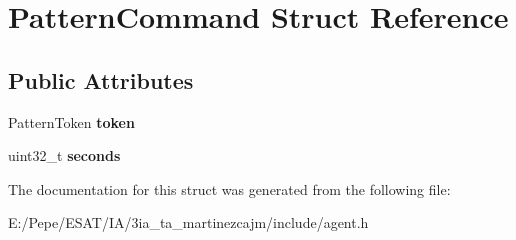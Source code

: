 \hypertarget{struct_pattern_command}{}\section{Pattern\+Command Struct Reference}
\label{struct_pattern_command}
\subsection*{Public Attributes}
\begin{DoxyCompactItemize}
\item 
\mbox{\label{struct_pattern_command_ab4e017f512d66adfaa4e71e0f6bec5fa}} 
Pattern\+Token {\bfseries token}
\item 
\mbox{\label{struct_pattern_command_aff9ece86af3e87ee0ff1735ca1d73aa8}} 
uint32\+\_\+t {\bfseries seconds}
\end{DoxyCompactItemize}


The documentation for this struct was generated from the following file\+:\begin{DoxyCompactItemize}
\item 
E\+:/\+Pepe/\+E\+S\+A\+T/\+I\+A/3ia\+\_\+ta\+\_\+martinezcajm/include/agent.\+h\end{DoxyCompactItemize}
